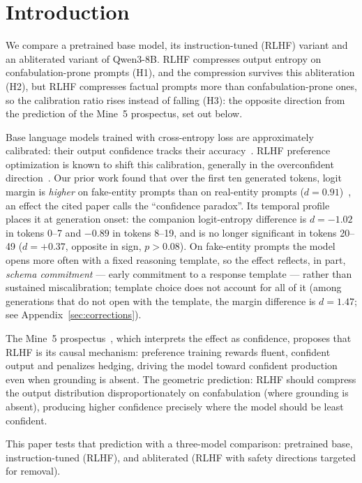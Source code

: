 \documentclass[11pt,a4paper]{article}
\begin{document}
\section{Introduction}
\label{sec:intro}

We compare a pretrained base model, its instruction-tuned (RLHF)
variant and an abliterated variant of Qwen3-8B. RLHF compresses output
entropy on confabulation-prone prompts (H1), and the compression
survives this abliteration (H2), but RLHF compresses factual prompts
more than confabulation-prone ones, so the calibration ratio rises
instead of falling (H3): the opposite direction from the prediction of
the Mine~5 prospectus, set out below.

Base language models trained with cross-entropy loss are approximately
calibrated: their output confidence tracks their accuracy~\citep{kadavath2022language}.
RLHF preference optimization is known to shift this calibration,
generally in the overconfident direction~\citep{openai2023gpt4}.
Our prior work found that over the first ten generated tokens, logit
margin is \emph{higher} on fake-entity prompts than on real-entity
prompts ($d{=}0.91$)~\citep{lyra2026decision}, an effect the cited paper calls the
``confidence paradox''. Its temporal profile places it at generation onset: the companion
logit-entropy difference is $d{=}{-}1.02$ in tokens 0--7 and $-0.89$ in
tokens 8--19, and is no longer significant in tokens 20--49
($d{=}{+}0.37$, opposite in sign, $p{>}0.08$). On fake-entity prompts the
model opens more often with a fixed reasoning template, so the effect reflects, in
part, \emph{schema commitment} --- early commitment to a response
template --- rather than sustained miscalibration; template choice does
not account for all of it (among generations that do not open with the
template, the margin difference is $d{=}1.47$; see
Appendix~\ref{sec:corrections}).

The Mine~5 prospectus~\citep{lyra2026mine5}, which interprets the effect
as confidence, proposes that RLHF is its causal
mechanism: preference training rewards fluent, confident
output and penalizes hedging, driving the model toward confident
production even when grounding is absent. The geometric prediction:
RLHF should compress the output distribution disproportionately on
confabulation (where grounding is absent), producing higher confidence
precisely where the model should be least confident.

This paper tests that prediction with a three-model comparison:
pretrained base, instruction-tuned (RLHF), and abliterated
(RLHF with safety directions targeted for removal).
\end{document}
